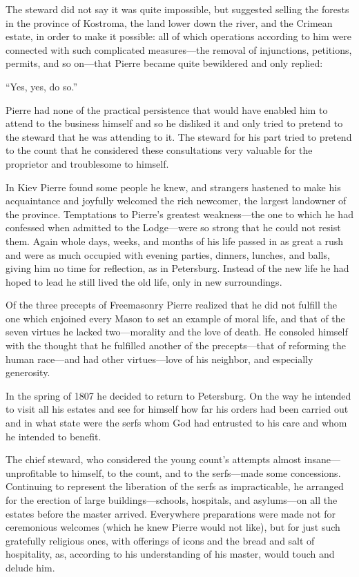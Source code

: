 The steward did not say it was quite impossible, but suggested
selling the forests in the province of Kostroma, the land lower
down the river, and the Crimean estate, in order to make it
possible: all of which operations according to him were connected
with such complicated measures---the removal of injunctions,
petitions, permits, and so on---that Pierre became quite
bewildered and only replied:

``Yes, yes, do so.''

Pierre had none of the practical persistence that would have
enabled him to attend to the business himself and so he disliked
it and only tried to pretend to the steward that he was attending
to it. The steward for his part tried to pretend to the count
that he considered these consultations very valuable for the
proprietor and troublesome to himself.

In Kiev Pierre found some people he knew, and strangers hastened
to make his acquaintance and joyfully welcomed the rich newcomer,
the largest landowner of the province. Temptations to Pierre's
greatest weakness---the one to which he had confessed when
admitted to the Lodge---were so strong that he could not resist
them. Again whole days, weeks, and months of his life passed in
as great a rush and were as much occupied with evening parties,
dinners, lunches, and balls, giving him no time for reflection,
as in Petersburg. Instead of the new life he had hoped to lead he
still lived the old life, only in new surroundings.

Of the three precepts of Freemasonry Pierre realized that he did
not fulfill the one which enjoined every Mason to set an example
of moral life, and that of the seven virtues he lacked
two---morality and the love of death. He consoled himself with
the thought that he fulfilled another of the precepts---that of
reforming the human race---and had other virtues---love of his
neighbor, and especially generosity.

In the spring of 1807 he decided to return to Petersburg. On the
way he intended to visit all his estates and see for himself how
far his orders had been carried out and in what state were the
serfs whom God had entrusted to his care and whom he intended to
benefit.

The chief steward, who considered the young count's attempts
almost insane---unprofitable to himself, to the count, and to the
serfs---made some concessions. Continuing to represent the
liberation of the serfs as impracticable, he arranged for the
erection of large buildings---schools, hospitals, and
asylums---on all the estates before the master arrived.
Everywhere preparations were made not for ceremonious welcomes
(which he knew Pierre would not like), but for just such
gratefully religious ones, with offerings of icons and the bread
and salt of hospitality, as, according to his understanding of
his master, would touch and delude him.

